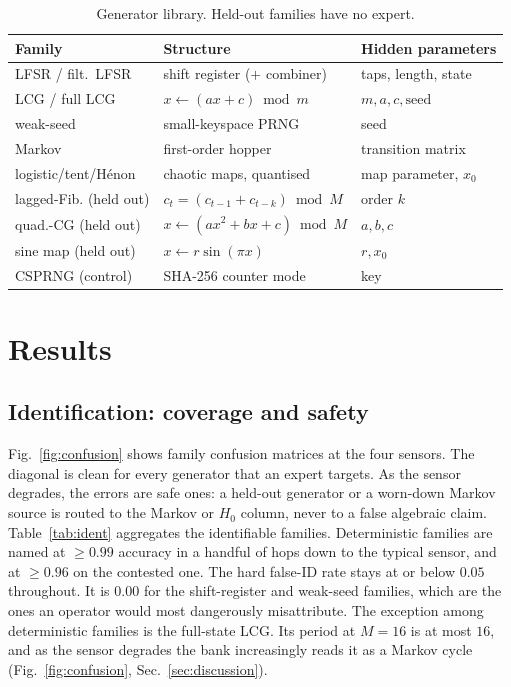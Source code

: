 \documentclass[conference]{IEEEtran}
\begin{document}
\begin{table}[t]
\centering
\caption{Generator library. Held-out families have no expert.}
\label{tab:gens}
\setlength{\tabcolsep}{4pt}
\footnotesize
\begin{tabular}{@{}lll@{}}
\toprule
Family & Structure & Hidden parameters \\
\midrule
LFSR / filt.\ LFSR & shift register ($+$ combiner) & taps, length, state \\
LCG / full LCG & $x\!\leftarrow\!(ax{+}c)\bmod m$ & $m,a,c,\text{seed}$ \\
weak-seed & small-keyspace PRNG & seed \\
Markov & first-order hopper & transition matrix \\
logistic/tent/H\'enon & chaotic maps, quantised & map parameter, $x_0$ \\
\midrule
lagged-Fib. (held out) & $c_t{=}(c_{t-1}{+}c_{t-k})\bmod M$ & order $k$ \\
quad.-CG (held out) & $x\!\leftarrow\!(ax^2{+}bx{+}c)\bmod M$ & $a,b,c$ \\
sine map (held out) & $x\!\leftarrow\!r\sin(\pi x)$ & $r,x_0$ \\
CSPRNG (control) & SHA-256 counter mode & key \\
\bottomrule
\end{tabular}
\end{table}

\section{Results}
\label{sec:results}

\subsection{Identification: coverage and safety}
Fig.~\ref{fig:confusion} shows family confusion matrices at the four sensors.
The diagonal is clean for every generator that an expert targets. As the sensor
degrades, the errors are safe ones: a held-out generator or a worn-down Markov
source is routed to the Markov or $H_0$ column, never to a false algebraic
claim. Table~\ref{tab:ident} aggregates the identifiable families.
Deterministic families are named at $\geq 0.99$ accuracy in a handful of hops
down to the typical sensor, and at $\geq 0.96$ on the contested one. The hard
false-ID rate stays at or below $0.05$ throughout. It is $0.00$ for the
shift-register and weak-seed families, which are the ones an operator would
most dangerously misattribute. The exception among deterministic families is
the full-state LCG. Its period at $M{=}16$ is at most $16$, and as the sensor
degrades the bank increasingly reads it as a Markov cycle
(Fig.~\ref{fig:confusion}, Sec.~\ref{sec:discussion}).
\end{document}
